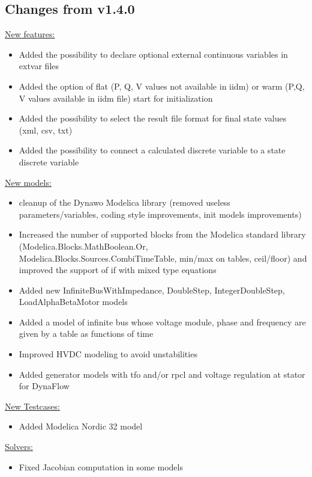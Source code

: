 \documentclass[a4paper, 12pt]{report}
\begin{document}
\subsection{Changes from v1.4.0}

\underline{New features:}
\begin{itemize}
\item Added the possibility to declare optional external continuous variables in extvar files
\item Added the option of flat (P, Q, V values not available in iidm) or warm (P,Q, V values available in iidm file) start for initialization
\item Added the possibility to select the result file format for final state values (xml, csv, txt)
\item Added the possibility to connect a calculated discrete variable to a state discrete variable
\end{itemize}

\underline{New models:}
\begin{itemize}
\item cleanup of the Dynawo Modelica library (removed useless parameters/variables, coding style improvements, init models improvements)
\item Increased the number of supported blocks from the Modelica standard library (Modelica.Blocks.MathBoolean.Or, Modelica.Blocks.Sources.CombiTimeTable, min/max on tables, ceil/floor) and improved the support of if with mixed type equations
\item Added new InfiniteBusWithImpedance, DoubleStep, IntegerDoubleStep, LoadAlphaBetaMotor models
\item Added a model of infinite bus whose voltage module, phase and frequency are given by a table as functions of time
\item Improved HVDC modeling to avoid unstabilities
\item Added generator models with tfo and/or rpcl and voltage regulation at stator for DynaFlow
\end{itemize}

\underline{New Testcases:}\begin{itemize}
\item Added Modelica Nordic 32 model
\end{itemize}

\underline{Solvers:}\begin{itemize}
\item Fixed Jacobian computation in some models
\end{itemize}
\end{document}
